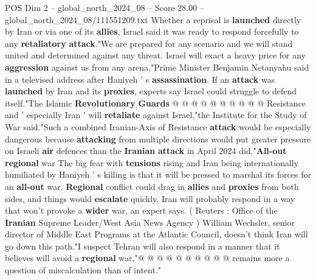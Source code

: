 \begin{textsample}{POS Dim 2 – global\_north\_2024\_08 – Score 28.00 – global\_north\_2024\_08/111551209.txt}
Whether a reprisal is \textbf{launched} directly by Iran or via one of its \textbf{allies}, Israel said it was ready to respond forcefully to any \textbf{retaliatory} \textbf{attack}."We are prepared for any scenario and we will stand united and determined against any threat.
Israel will exact a heavy price for any \textbf{aggression} against us from any arena,"Prime Minister Benjamin Netanyahu said in a televised address after Haniyeh ' s \textbf{assassination}.
If an \textbf{attack} was \textbf{launched} by Iran and its \textbf{proxies}, experts say Israel could struggle to defend itself."The Islamic \textbf{Revolutionary} \textbf{Guards} @ @ @ @ @ @ @ @ @ @ Resistance and ' especially Iran ' will \textbf{retaliate} against Israel,"the Institute for the Study of War said."Such a combined Iranian-Axis of Resistance \textbf{attack} would be especially dangerous because \textbf{attacking} from multiple directions would put greater pressure on Israeli \textbf{air} defences than the \textbf{Iranian} \textbf{attack} in April 2024 did."\textbf{All-out} \textbf{regional} war The big fear with \textbf{tensions} rising and Iran being internationally humiliated by Haniyeh ' s killing is that it will be pressed to marshal its forces for an \textbf{all-out} war. \textbf{Regional} conflict could drag in \textbf{allies} and \textbf{proxies} from both sides, and things would \textbf{escalate} quickly.
Iran will probably respond in a way that won't provoke a \textbf{wider} war, an expert says. ( Reuters : Office of the \textbf{Iranian} Supreme Leader/West Asia News Agency ) William Wechsler, senior director of Middle East Programs at the Atlantic Council, doesn't think Iran will go down this path."I suspect Tehran will also respond in a manner that it believes will avoid a \textbf{regional} war,"@ @ @ @ @ @ @ @ @ @ remains more a question of miscalculation than of intent."

\end{textsample}
